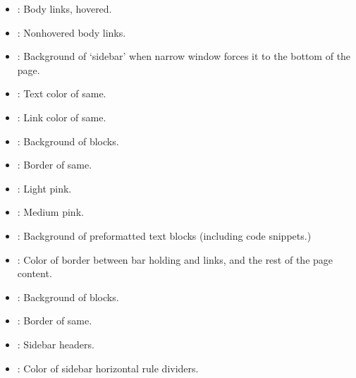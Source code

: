 \documentclass[letterpaper,10pt,english]{sphinxmanual}
\begin{document}
\begin{itemize}
\item {} 
: Body links, hovered.

\item {} 
: Non\sphinxhyphen{}hovered body links.

\item {} 
: Background of ‘sidebar’ when narrow window forces
it to the bottom of the page.

\item {} 
: Text color of same.

\item {} 
: Link color of same.

\item {} 
: Background of  blocks.

\item {} 
: Border of same.

\item {} 
: Light pink.

\item {} 
: Medium pink.

\item {} 
: Background of preformatted text blocks (including code
snippets.)

\item {} 
: Color of border between bar holding  and 
links, and the rest of the page content.

\item {} 
: Background of  blocks.

\item {} 
: Border of same.

\item {} 
: Sidebar headers.

\item {} 
: Color of sidebar horizontal rule dividers.


\end{itemize}
\end{document}
